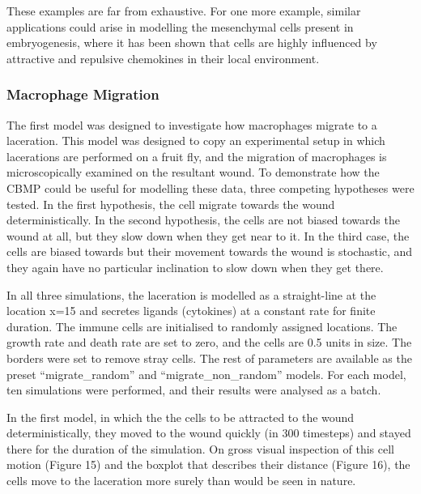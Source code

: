 \documentclass[12pt]{article}
\begin{document}
These examples are far from exhaustive. For one more example, similar 
applications could arise in modelling the mesenchymal cells present in 
embryogenesis,\cite{caplan91} \cite{merks05} where it has been shown that cells are highly influenced 
by attractive and repulsive chemokines in their local environment.

\subsubsection{Macrophage Migration}
The first model was designed to investigate how macrophages migrate to a 
laceration. This model was designed to copy an experimental setup in 
which lacerations are performed on a fruit fly, and the migration of 
macrophages is microscopically examined on the resultant wound. 
To 
demonstrate how the CBMP could be useful for modelling these data, three 
competing hypotheses were tested. In the first hypothesis, the cell 
migrate towards the wound deterministically. In the second hypothesis, 
the cells are not biased towards the wound at all, but they slow down 
when they get near to it. In the third case, the cells are biased 
towards but their movement towards the wound is stochastic, and they 
again have no particular inclination to slow down when they get there.

In all three simulations, the laceration is modelled as a straight-line 
at the location x=15 and secretes ligands (cytokines) at a constant rate 
for finite duration. The immune cells are initialised to randomly assigned 
locations. The growth rate and death rate are set to zero, and the cells 
are 0.5 units in size. The borders were set to remove stray cells. The 
rest of parameters are available as the preset ``migrate\_random'' and 
``migrate\_non\_random'' models. For each model, ten simulations were 
performed, and their results were analysed as a batch.

In the first model, in which the the cells to be attracted to the wound 
deterministically, they moved to the wound quickly (in 300 timesteps) 
and stayed there for the duration of the simulation. On gross visual 
inspection of this cell motion (Figure 15) and the boxplot that describes 
their distance (Figure 16), the cells move to the laceration more surely 
than would be seen in nature.
\end{document}
